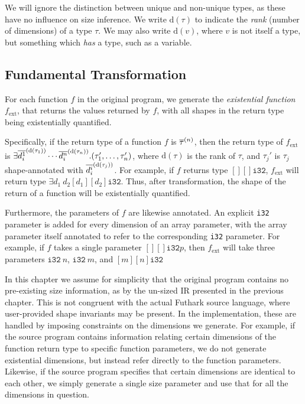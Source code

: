 We will ignore the distinction between unique and non-unique types, as
these have no influence on size inference.  We write $\text{d}(\tau)$
to indicate the \emph{rank} (number of dimensions) of a type $\tau$.
We may also write $\text{d}(v)$, where $v$ is not itself a type, but
something which {\em has} a type, such as a variable.

\subsection{Fundamental Transformation}
\label{sec:FundamentalTransformation}

\newcommand{\ext}{\textrm{ext}}
\newcommand{\shape}{\textrm{shape}}
\newcommand{\val}{\textrm{value}}
\newcommand{\checking}{\textrm{checking}}

For each function $f$ in the original program, we generate the
\textit{existential function} $f_{\ext}$, that returns the values
returned by $f$, with all shapes in the return type being
existentially quantified.

Specifically, if the return type of a function \(f\) is
$\overline{\tau}^{(n)}$, then the return type of \(f_{\ext}\) is
\(\exists\overline{d^{1}_{i}}^{(\text{d}(\tau_{1}))}\cdots\overline{d^{n}_{i}}^{(\text{d}(\tau_{n}))}.(\tau_{1}',
\ldots, \tau_{n}')\), where $\text{d}(\tau)$ is the rank of $\tau$,
and \(\tau_{j}'\) is \(\tau_{j}\) shape-annotated with
\(\overline{d^{i}_{i}}^{(\text{d}(\tau_{j}))}\).
%
For example, if \(f\) returns type \([][]\texttt{i32}\), \(f_{\ext}\)
will return type \(\exists d_{1}~d_{2}[d_{1}][d_{2}]\texttt{i32}\).
Thus, after transformation, the shape of the return of a function will
be existentially quantified.

Furthermore, the parameters of \(f\) are likewise annotated.  An
explicit \texttt{i32} parameter is added for every dimension of an
array parameter, with the array parameter itself annotated to refer to
the corresponding \texttt{i32} parameter.  For example, if \(f\) takes
a single parameter \([][]\texttt{i32} p\), then \(f_{\ext}\) will take
three parameters \(\texttt{i32}~n\), \(\texttt{i32}~m\), and
\([m][n]\texttt{i32}\)

In this chapter we assume for simplicity that the original program
contains no pre-existing size information, as by the un-sized IR
presented in the previous chapter.  This is not congruent with the
actual Futhark source language, where user-provided shape invariants
may be present.  In the implementation, these are handled by imposing
constraints on the dimensions we generate.  For example, if the source
program contains information relating certain dimensions of the
function return type to specific function parameters, we do not
generate existential dimensions, but instead refer directly to the
function parameters.  Likewise, if the source program specifies that
certain dimensions are identical to each other, we simply generate a
single size parameter and use that for all the dimensions in question.


